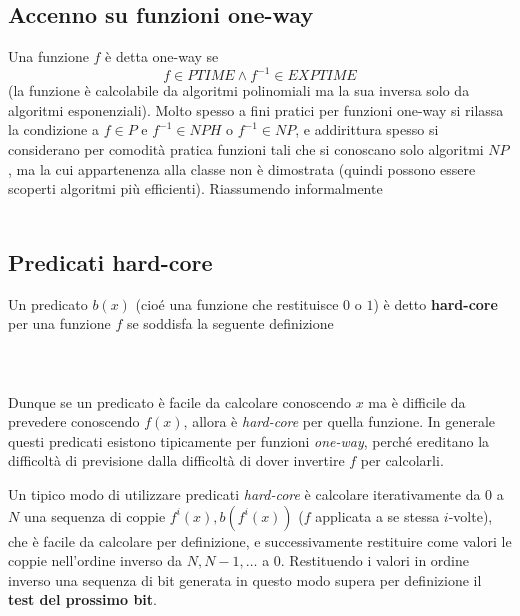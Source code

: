 \documentclass{article}
\begin{document}
\subsection{Accenno su funzioni one-way}
Una funzione $f$ è detta one-way se \[
f\in PTIME \land f^{-1}\in EXPTIME
\]
(la funzione è calcolabile da algoritmi polinomiali ma la sua inversa solo da algoritmi esponenziali). Molto spesso a fini pratici per funzioni one-way si rilassa la condizione a $f\in P$ e $f^{-1}\in NPH$ o $f^{-1}\in NP$, e addirittura spesso si considerano per comodità pratica funzioni tali che si conoscano solo algoritmi $NP$, ma la cui appartenenza alla classe non è dimostrata (quindi possono essere scoperti algoritmi più efficienti).
Riassumendo informalmente\\
\\

\subsection{Predicati hard-core}
Un predicato $b(x)$ (cioé una funzione che restituisce $0$ o $1$) è detto \textbf{hard-core} per una funzione $f$ se soddisfa la seguente definizione\\
\\
\\
\\
Dunque se un predicato è facile da calcolare conoscendo $x$ ma è difficile da prevedere conoscendo $f(x)$, allora è \textit{hard-core} per quella funzione. In generale questi predicati esistono tipicamente per funzioni \emph{one-way}, perché ereditano la difficoltà di previsione dalla difficoltà di dover invertire $f$ per calcolarli.

Un tipico modo di utilizzare predicati \textit{hard-core} è calcolare iterativamente da $0$ a $N$ una sequenza di coppie $ f^i(x),b(f^i(x))$ ($f$ applicata a se stessa $i$-volte), che è facile da calcolare per definizione, e successivamente restituire come valori le coppie nell'ordine inverso da $N,N-1,\dots$ a $0$. Restituendo i valori in ordine inverso una sequenza di bit generata in questo modo supera per definizione il \textbf{test del prossimo bit}.
\end{document}
